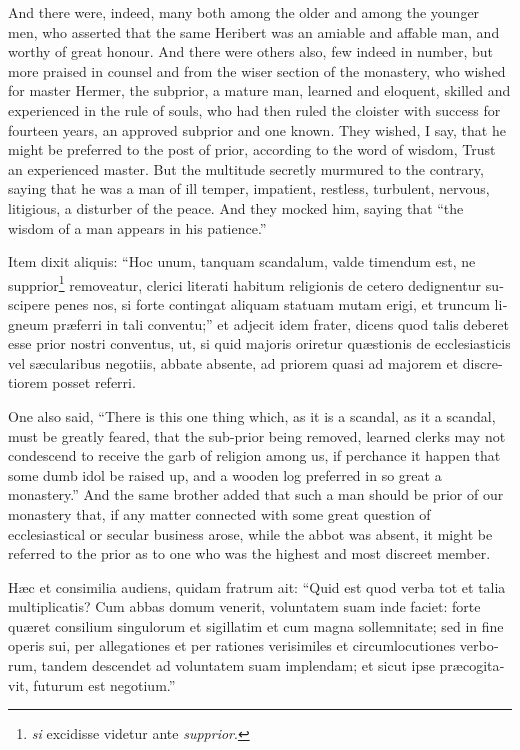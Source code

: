 \documentclass[10pt]{book}
\begin{document}
\begin{paracol}{2}
\switchcolumn

And there were, indeed, many both among the older and among the younger men, who asserted that the same Heribert was an amiable and affable man, and worthy of great honour. And there were others also, few indeed in number, but more praised in counsel and from the wiser section of the monastery, who wished for master Hermer, the subprior, a mature man, learned and eloquent, skilled and experienced in the rule of souls, who had then ruled the cloister with success for fourteen years, an approved subprior and one known. They wished, I say, that he might be preferred to the post of prior, according to the word of wisdom, Trust an experienced master. But the multitude secretly murmured to the contrary, saying that he was a man of ill temper, impatient, restless, turbulent, nervous, litigious, a disturber of the peace. And they mocked him, saying that ``the wisdom of a man appears in his patience.''

\switchcolumn*

\begin{otherlanguage}{latin}
Item dixit aliquis: ``Hoc unum, tanquam scandalum, valde timendum est, ne supprior\footnote[\ddag]{\emph{si} excidisse videtur ante \emph{supprior}.} removeatur, clerici literati habitum religionis de cetero dedignentur suscipere penes nos, si forte contingat aliquam statuam mutam erigi, et truncum ligneum pr\ae{}ferri in tali conventu;'' et adjecit idem frater, dicens quod talis deberet esse prior nostri conventus, ut, si quid majoris oriretur qu\ae{}stionis de ecclesiasticis vel s\ae{}cularibus negotiis, abbate absente, ad priorem quasi ad majorem et discretiorem posset referri. 
\end{otherlanguage}

\switchcolumn

One also said, ``There is this one thing which, as it is a scandal, as it a scandal, must be greatly feared, that the sub-prior being removed, learned clerks may not condescend to receive the garb of religion among us, if perchance it happen that some dumb idol be raised up, and a wooden log preferred in so great a monastery.'' And the same brother added that such a man should be prior of our monastery that, if any matter connected with some great question of ecclesiastical or secular business arose, while the abbot was absent, it might be referred to the prior as to one who was the highest and most discreet member.

\switchcolumn*

\begin{otherlanguage}{latin}
H\ae{}c et consimilia audiens, quidam fratrum ait: ``Quid est quod verba tot et talia multiplicatis? Cum abbas domum venerit, voluntatem suam inde faciet: forte qu\ae{}ret consilium singulorum et sigillatim et cum magna sollemnitate; sed in fine operis sui, per allegationes et per rationes verisimiles et circumlocutiones verborum, tandem descendet ad voluntatem suam implendam; et sicut ipse pr\ae{}cogitavit, futurum est negotium.''
\end{otherlanguage}


\end{paracol}
\end{document}
